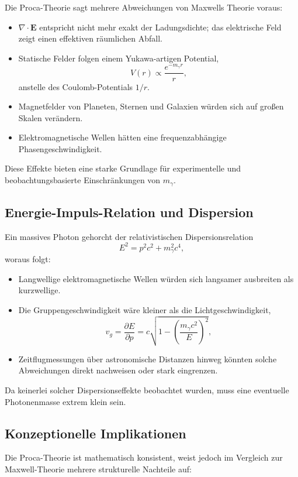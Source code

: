 Die Proca-Theorie sagt mehrere Abweichungen von Maxwells Theorie voraus:

\begin{itemize}
	\item $\nabla \cdot \mathbf{E}$ entspricht nicht mehr exakt der 
	Ladungsdichte; das elektrische Feld zeigt einen effektiven 
	räumlichen Abfall.
	\item Statische Felder folgen einem Yukawa-artigen Potential,
	\[
	V(r) \propto \frac{e^{-m_\gamma r}}{r},
	\]
	anstelle des Coulomb-Potentials $1/r$.
	\item Magnetfelder von Planeten, Sternen und Galaxien würden sich auf 
	großen Skalen verändern.
	\item Elektromagnetische Wellen hätten eine frequenzabhängige 
	Phasengeschwindigkeit.
\end{itemize}

Diese Effekte bieten eine starke Grundlage für experimentelle und 
beobachtungsbasierte Einschränkungen von $m_\gamma$.

\subsection*{Energie-Impuls-Relation und Dispersion}

Ein massives Photon gehorcht der relativistischen Dispersionsrelation
\[
E^2 = p^2 c^2 + m_\gamma^2 c^4,
\]
woraus folgt:

\begin{itemize}
	\item Langwellige elektromagnetische Wellen würden sich langsamer 
	ausbreiten als kurzwellige.
	\item Die Gruppengeschwindigkeit wäre kleiner als die Lichtgeschwindigkeit,
	\[
	v_g = \frac{\partial E}{\partial p}
	= c \sqrt{1 - \left(\frac{m_\gamma c^2}{E}\right)^2},
	\]
	\item Zeitflugmessungen über astronomische Distanzen hinweg könnten 
	solche Abweichungen direkt nachweisen oder stark eingrenzen.
\end{itemize}

Da keinerlei solcher Dispersionseffekte beobachtet wurden, muss eine 
eventuelle Photonenmasse extrem klein sein.

\subsection*{Konzeptionelle Implikationen}

Die Proca-Theorie ist mathematisch konsistent, weist jedoch im Vergleich 
zur Maxwell-Theorie mehrere strukturelle Nachteile auf:

